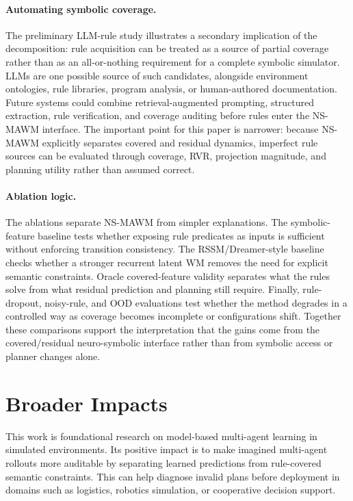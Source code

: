 \documentclass{article}
\theoremstyle{plain}
\theoremstyle{definition}
\theoremstyle{remark}
\begin{document}
\paragraph{Automating symbolic coverage.}
The preliminary LLM-rule study illustrates a secondary implication of the decomposition: rule acquisition can be treated as a source of partial coverage rather than as an all-or-nothing requirement for a complete symbolic simulator. LLMs are one possible source of such candidates, alongside environment ontologies, rule libraries, program analysis, or human-authored documentation. Future systems could combine retrieval-augmented prompting, structured extraction, rule verification, and coverage auditing before rules enter the NS-MAWM interface. The important point for this paper is narrower: because NS-MAWM explicitly separates covered and residual dynamics, imperfect rule sources can be evaluated through coverage, RVR, projection magnitude, and planning utility rather than assumed correct.

\paragraph{Ablation logic.}
The ablations separate NS-MAWM from simpler explanations. The symbolic-feature baseline tests whether exposing rule predicates as inputs is sufficient without enforcing transition consistency. The RSSM/Dreamer-style baseline checks whether a stronger recurrent latent WM removes the need for explicit semantic constraints. Oracle covered-feature validity separates what the rules solve from what residual prediction and planning still require. Finally, rule-dropout, noisy-rule, and OOD evaluations test whether the method degrades in a controlled way as coverage becomes incomplete or configurations shift. Together these comparisons support the interpretation that the gains come from the covered/residual neuro-symbolic interface rather than from symbolic access or planner changes alone.

\section{Broader Impacts}
\label{sec:broader_impacts}

This work is foundational research on model-based multi-agent learning in simulated environments. Its positive impact is to make imagined multi-agent rollouts more auditable by separating learned predictions from rule-covered semantic constraints. This can help diagnose invalid plans before deployment in domains such as logistics, robotics simulation, or cooperative decision support.
\end{document}
